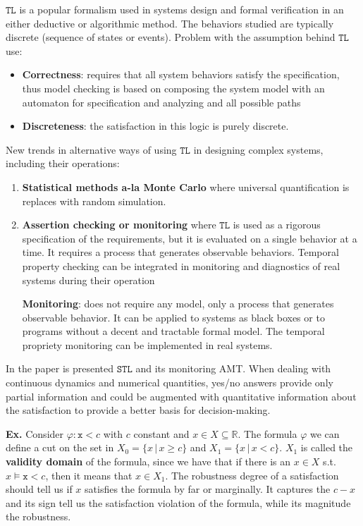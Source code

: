 \documentclass{suftesi}
\renewcommand{\b}{\textbf}
\newcommand{\STL}{$\mathtt{STL}$ }
\newcommand{\TL}{$\mathtt{TL}$ }
\begin{document}
\TL is a popular formalism used in systems design and formal verification in an either deductive or algorithmic method.  The behaviors studied are typically discrete (sequence of states or events). Problem with the assumption behind \TL use:
\begin{itemize}[leftmargin=0.5cm]
    \item \b{Correctness}: requires that all system behaviors satisfy the specification, thus model checking is based on composing the system model with an automaton for specification and analyzing and all possible paths
    \item \b{Discreteness}: the satisfaction in this logic is purely discrete.
\end{itemize}

New trends in alternative ways of using \TL in designing complex systems, including their operations:
\begin{enumerate}[leftmargin=0.5cm]
    \item \b{Statistical methods a-la Monte Carlo} where universal quantification is replaces with random simulation. 
    \item  \b{Assertion checking or monitoring} where \TL is used as a rigorous specification of the requirements, but it is evaluated on a single behavior at a time. It requires a process that generates observable behaviors. Temporal property checking can be integrated in monitoring and diagnostics of real systems during their operation
\end{enumerate}

\begin{itemize}[leftmargin=2.05cm]
    \item [\b{Monitoring}:] does not require any model, only a process that generates observable behavior. It can be applied to systems as black boxes or to programs without a decent and tractable formal model. The temporal propriety monitoring can be implemented in real systems.
\end{itemize}

In the paper is presented \STL and its monitoring AMT. When dealing with continuous dynamics and numerical quantities, yes/no answers provide only partial information and could be augmented with quantitative information about the satisfaction to provide a better basis for decision-making. 

\b{Ex.} Consider $\varphi: \mathtt{x}<c$ with $c$ constant and $x\in X\subseteq\mathbb{R}$. The formula $\varphi$ we can define a cut on the set in $X_0=\{x\,|\,x\geq c\}$ and $X_1=\{x\,|\,x<c\}$. $X_1$ is called the \b{validity domain} of the formula, since we have that if there is an $x\in X$ s.t. $x\vDash\mathtt{x}<c$, then it means that $x\in X_1$. The robustness degree of a satisfaction should tell us if $x$ satisfies the formula by far or marginally. It captures the $c-x$ and its sign tell us the satisfaction violation of the formula, while its magnitude the robustness. 
\end{document}
